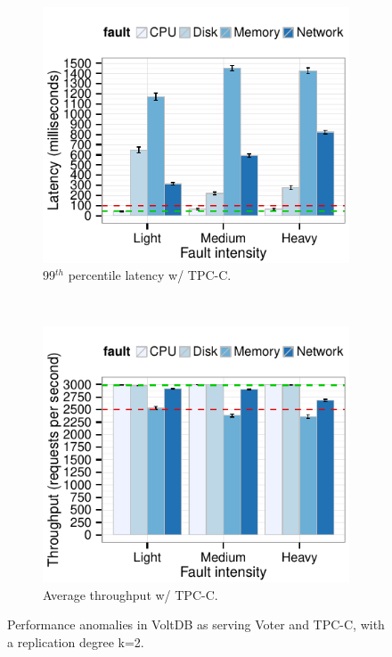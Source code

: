 \begin{figure}
        \begin{subfigure}[b]{0.48\textwidth}
                  \includegraphics[width=1\textwidth]{inputs/img/fault_impact_this_latency_99th_voltdb_tpcc}
                \caption{99$^{th}$ percentile latency w/ TPC-C.}
                \label{fig:fault_impact_this_latency_99th_voltdb_tpcc}
        \end{subfigure}
	  ~
        \begin{subfigure}[b]{0.48\textwidth}
                  \includegraphics[width=1\textwidth]{inputs/img/fault_impact_this_throughput_voltdb_tpcc}
                \caption{Average throughput w/ TPC-C.}
                \label{fig:fault_impact_this_throughput_voltdb_tpcc}
        \end{subfigure}
        \caption{Performance anomalies in VoltDB as serving Voter and TPC-C, with a replication degree k=2.}
                \label{fig:performance_overview}


\end{figure}


